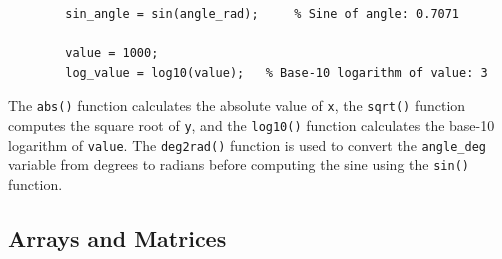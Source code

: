 \documentclass[
11pt, %
a4paper, %
oneside, %
headinclude,footinclude, %
BCOR5mm, %
]{scrartcl}
\begin{document}
\begin{enumerate}
\begin{verbatim}
		sin_angle = sin(angle_rad);     % Sine of angle: 0.7071
		
		value = 1000;
		log_value = log10(value);   % Base-10 logarithm of value: 3
	\end{verbatim}
	
	The \texttt{abs()} function calculates the absolute value of \texttt{x}, the \texttt{sqrt()} function computes the square root of \texttt{y}, and the \texttt{log10()} function calculates the base-10 logarithm of \texttt{value}. The \texttt{deg2rad()} function is used to convert the \texttt{angle\_deg} variable from degrees to radians before computing the sine using the \texttt{sin()} function.
	
\end{enumerate}

\subsection{Arrays and Matrices}
\end{document}
